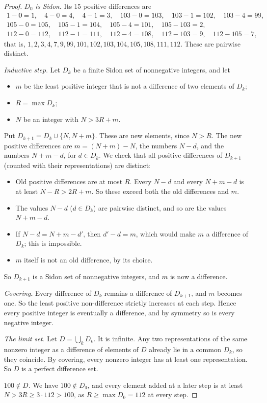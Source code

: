 \documentclass[11pt]{article}
\theoremstyle{definition}
\theoremstyle{remark}
\begin{document}
\begin{proof}
\emph{$D_0$ is Sidon.} Its $15$ positive differences are
\[
\begin{gathered}
1-0=1,\quad 4-0=4,\quad 4-1=3,\quad 103-0=103,\quad 103-1=102,\quad 103-4=99,\\
105-0=105,\quad 105-1=104,\quad 105-4=101,\quad 105-103=2,\\
112-0=112,\quad 112-1=111,\quad 112-4=108,\quad 112-103=9,\quad 112-105=7,
\end{gathered}
\]
that is, $1,2,3,4,7,9,99,101,102,103,104,105,108,111,112$. These are pairwise distinct.

\emph{Inductive step.} Let $D_k$ be a finite Sidon set of nonnegative integers, and let
\begin{itemize}[nosep]
\item $m$ be the least positive integer that is not a difference of two elements of $D_k$;
\item $R=\max D_k$;
\item $N$ be an integer with $N>3R+m$.
\end{itemize}
Put $D_{k+1}=D_k\cup\{N,N+m\}$. These are new elements, since $N>R$. The new positive differences are $m=(N+m)-N$, the numbers $N-d$, and the numbers $N+m-d$, for $d\in D_k$. We check that all positive differences of $D_{k+1}$ (counted with their representations) are distinct:
\begin{itemize}[nosep]
\item Old positive differences are at most $R$. Every $N-d$ and every $N+m-d$ is at least $N-R>2R+m$. So these exceed both the old differences and $m$.
\item The values $N-d$ ($d\in D_k$) are pairwise distinct, and so are the values $N+m-d$.
\item If $N-d=N+m-d'$, then $d'-d=m$, which would make $m$ a difference of $D_k$; this is impossible.
\item $m$ itself is not an old difference, by its choice.
\end{itemize}
So $D_{k+1}$ is a Sidon set of nonnegative integers, and $m$ is now a difference.

\emph{Covering.} Every difference of $D_k$ remains a difference of $D_{k+1}$, and $m$ becomes one. So the least positive non-difference strictly increases at each step. Hence every positive integer is eventually a difference, and by symmetry so is every negative integer.

\emph{The limit set.} Let $D=\bigcup_k D_k$. It is infinite. Any two representations of the same nonzero integer as a difference of elements of $D$ already lie in a common $D_k$, so they coincide. By covering, every nonzero integer has at least one representation. So $D$ is a perfect difference set.

\emph{$100\notin D$.} We have $100\notin D_0$, and every element added at a later step is at least $N>3R\ge3\cdot112>100$, as $R\ge\max D_0=112$ at every step.
\end{proof}
\end{document}
